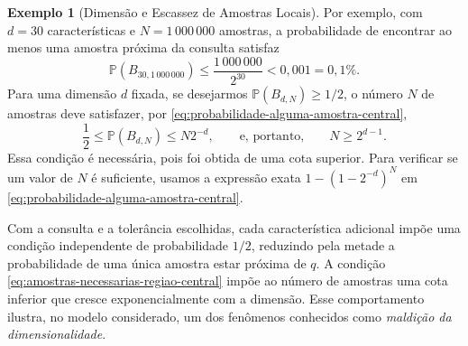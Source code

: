 \documentclass[12pt,portuguese]{article}
\theoremstyle{definition}
\newtheorem{example}[example]{Exemplo}
\theoremstyle{plainexercise}
\theoremstyle{starredexercise}
\theoremstyle{definition}
\begin{document}
\begin{example}[Dimensão e Escassez de Amostras Locais]
  Por exemplo, com $d=30$ características e $N=1\,000\,000$ amostras, a
  probabilidade de encontrar ao menos uma amostra próxima da consulta
  satisfaz
  \[
    \mathbb{P}(B_{30,1\,000\,000})
    \leqslant \frac{1\,000\,000}{2^{30}}
    < 0{,}001 = 0{,}1\%.
  \]
  Para uma dimensão $d$ fixada, se desejarmos
  $\mathbb{P}(B_{d,N})\geqslant1/2$, o número $N$ de amostras deve
  satisfazer, por \eqref{eq:probabilidade-alguma-amostra-central},
  \begin{equation}\label{eq:amostras-necessarias-regiao-central}
    \frac12\leqslant\mathbb{P}(B_{d,N})\leqslant N2^{-d},
    \qquad\text{e, portanto,}\qquad N\geqslant 2^{d-1}.
  \end{equation}
  Essa condição é necessária, pois foi obtida de uma cota superior. Para
  verificar se um valor de $N$ é suficiente, usamos a expressão exata
  $1-(1-2^{-d})^N$ em \eqref{eq:probabilidade-alguma-amostra-central}.

  Com a consulta e a tolerância escolhidas, cada característica adicional
  impõe uma condição independente de probabilidade $1/2$, reduzindo pela
  metade a probabilidade de uma única amostra estar próxima de $q$.
  A condição \eqref{eq:amostras-necessarias-regiao-central} impõe ao número
  de amostras uma cota inferior que cresce exponencialmente com a
  dimensão. Esse comportamento ilustra, no modelo considerado, um
  dos fenômenos conhecidos como \emph{maldição da dimensionalidade}.
\end{example}



\end{document}
